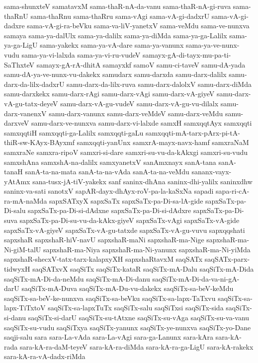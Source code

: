 {sama-shunxteV
samatavxM
sama-thaR-nA-da-vanu
sama-thaR-nA-gi-ruva
sama-thaRnU
sama-thaRnu
sama-thaRru
sama-vAgi
sama-vA-gi-dadxrU
sama-vA-gi-dadxre
sama-vA-gi-ra-beVku
sama-va-liV-yanetxV
sama-veMdu
sama-ve-nunxva
samaya
sama-ya-dalUlx
sama-ya-dalilx
sama-ya-diMda
sama-ya-ga-Lalilx
sama-ya-ga-LigU
sama-yakekx
sama-ya-vA-dare
sama-ya-vanunx
sama-ya-ve-nunx-vudu
sama-ya-vi-lalxda
sama-ya-vi-ru-vudeV
samayx-gA-di-tayx-mu-pa-ti-SaThxteV
samayx-gA-rA-dhitA
samayxkf
samoV
samu-ci-taveV
samu-dA-yada
samu-dA-ya-ve-nunx-vu-dakekx
samudarx
samu-darxda
samu-darx-dalilx
samu-darx-da-lilx-dadxrU
samu-darx-da-lilx-ruva
samu-darx-dalolxV
samu-darx-diMda
samu-darxkekx
samu-darx-rAgi
samu-darx-vAgi
samu-darx-vA-giyeV
samu-darx-vA-gu-tatx-deyeV
samu-darx-vA-gu-vudeV
samu-darx-vA-gu-vu-dilalx
samu-darx-vanenxV
samu-darx-vanunx
samu-darx-veMdeV
samu-darx-veMdu
samu-darxveV
samu-darx-ve-nunxva
samu-darx-vi-lalxde
samxH
samxqqtAyx
samxqqti
samxqqtiH
samxqqti-ga-Lalilx
samxqqti-gaLu
samxqqti-mA-tarx-pArx-pi-tA-thiR-sw-KAyx-BAyxmf
samxqqti-yanUnx
samxrA-mayx-navx-hamf
samxraNaM
samxraNe
samxra-ripoV
samxri-si-dare
samxri-su-vu-da-kAkxgi
samxri-su-vudu
samxshAna
samxshA-na-dalilx
samxyanetxV
sanAmxnayx
sanA-tana
sanA-tanaH
sanA-ta-na-mata
sanA-ta-na-vAda
sanA-ta-na-veMdu
sananx-vayx-yAtAmx
sana-tusx-jA-tiV-yakekx
sanf
saninx-dhAna
saninx-dhi-yalilx
saninxdhw
saninx-va-sati
sanotxV
sapAR-dayx-dhAyx-roV-pa-la-kaSxNa
sapadi
sapa-ri-cA-ra-mA-naMda
sapxSATxyX
sapxSaTx
sapxSaTx-pa-Di-sa-lA-gide
sapxSaTx-pa-Di-salu
sapxSaTx-pa-Di-si-dAdxne
sapxSaTx-pa-Di-si-dAdxre
sapxSaTx-pa-Di-suva
sapxSaTx-pa-Di-su-vu-da-kAkx-giyeV
sapxSaTx-vAgi
sapxSaTx-vA-gide
sapxSaTx-vA-giyeV
sapxSaTx-vA-gu-tatxde
sapxSaTx-vA-gu-vuvu
sapxqqshati
sapxshaR
sapxshaR-hiV-navU
sapxshaR-maNi
sapxshaR-ma-Nige
sapxshaR-ma-Ni-giM-talU
sapxshaR-ma-Niya
sapxshaR-ma-Ni-yanunx
sapxshaR-ma-Ni-yiMda
sapxshaR-shecxV-tatx-tarx-kalapxyXH
sapxshaRtavxM
saqSATx
saqSATx-parx-tidwyxH
saqSATxvX
saqSiTx
saqSiTx-kataR
saqSiTx-mA-Dalu
saqSiTx-mA-Dida
saqSiTx-mA-Di-da-neMdu
saqSiTx-mA-Di-danu
saqSiTx-mA-Di-da-va-ni-gA-darU
saqSiTx-mA-Duva
saqSiTx-mA-Du-vu-dakekx
saqSiTx-sa-beV-keMdu
saqSiTx-sa-beV-ke-nunxva
saqSiTx-sa-beVku
saqSiTx-sa-lapx-TaTxvu
saqSiTx-sa-lapx-TiTxtoV
saqSiTx-sa-lapxTuTx
saqSiTx-salu
saqSiTxsi
saqSiTx-sida
saqSiTx-si-danu
saqSiTx-si-darU
saqSiTx-su-tAtxne
saqSiTx-su-vAga
saqSiTx-su-va-vanu
saqSiTx-su-vudu
saqSiTxya
saqSiTx-yanunx
saqSiTx-ye-nunxva
saqSiTx-yo-Dane
saqji-salu
sara
sara-La-vAda
sara-La-vAgi
sara-ga-Lanunx
sara-kAra
sara-kA-rada
sara-kA-ra-daM-teyeV
sara-kA-ra-diMda
sara-kA-ra-ga-LigU
sara-kA-rakekx
sara-kA-ra-vA-dadx-riMda
}
